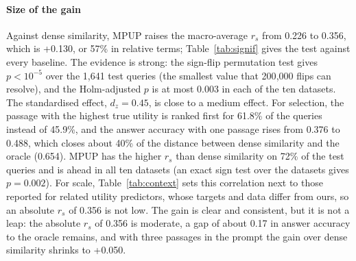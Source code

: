 \documentclass[preprint,12pt,authoryear]{elsarticle}
\begin{document}
\paragraph{Size of the gain} Against dense similarity, MPUP raises the macro-average $r_s$ from 0.226 to 0.356, which is +0.130, or 57\% in relative terms; Table~\ref{tab:signif} gives the test against every baseline. The evidence is strong: the sign-flip permutation test gives $p < 10^{-5}$ over the 1,641 test queries (the smallest value that 200{,}000 flips can resolve), and the Holm-adjusted $p$ is at most 0.003 in each of the ten datasets. The standardised effect, $d_z = 0.45$, is close to a medium effect. For selection, the passage with the highest true utility is ranked first for 61.8\% of the queries instead of 45.9\%, and the answer accuracy with one passage rises from 0.376 to 0.488, which closes about 40\% of the distance between dense similarity and the oracle (0.654). MPUP has the higher $r_s$ than dense similarity on 72\% of the test queries and is ahead in all ten datasets (an exact sign test over the datasets gives $p = 0.002$). For scale, Table~\ref{tab:context} sets this correlation next to those reported for related utility predictors, whose targets and data differ from ours, so an absolute $r_s$ of 0.356 is not low. The gain is clear and consistent, but it is not a leap: the absolute $r_s$ of 0.356 is moderate, a gap of about 0.17 in answer accuracy to the oracle remains, and with three passages in the prompt the gain over dense similarity shrinks to +0.050.
\end{document}
